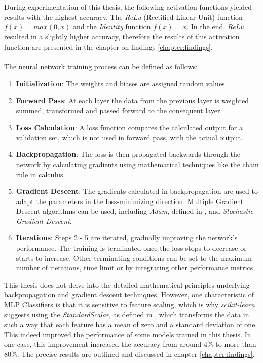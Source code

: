 \\\\
During experimentation of this thesis, the following activation functions yielded results with the highest accuracy. The \textit{ReLu} (Rectified Linear Unit) function $f(x)=max(0,x)$ and the \textit{Identity} function $f(x)=x$. In the end, \textit{ReLu} resulted in a slightly higher accuracy, therefore the results of this activation function are presented in the chapter on findings \ref{chapter:findings}.
\\\\
The neural network training process can be defined as follows:
\begin{enumerate}
    \item \textbf{Initialization}: The weights and biases are assigned random values.
    \item \textbf{Forward Pass}: At each layer the data from the previous layer is weighted summed, transformed and passed forward to the consequent layer.
    \item \textbf{Loss Calculation}: A loss function compares the calculated output for a validation set, which is not used in forward pass, with the actual output. 
    \item \textbf{Backpropagation}: The loss is then propagated backwards through the network by calculating gradients using mathematical techniques like the chain rule in calculus. 
    \item \textbf{Gradient Descent}: The gradients calculated in backpropagation are used to adapt the parameters in the loss-minimizing direction. Multiple Gradient Descent algorithms can be used, including \textit{Adam}, defined in \parencite{kingma2017adam}, and \textit{Stochastic Gradient Descent}. 
    \item \textbf{Iterations}: Steps 2 - 5 are iterated, gradually improving the network's performance. The training is terminated once the loss stops to decrease or starts to increase. Other terminating conditions can be set to the maximum number of iterations, time limit or by integrating other performance metrics. 
\end{enumerate}
This thesis does not delve into the detailed mathematical principles underlying backpropagation and gradient descent techniques. However, one characteristic of MLP Classifiers is that it is sensitive to feature scaling, which is why \textit{scikit-learn} \parencite{117Neura38:online} suggests using the \textit{StandardScalar}, as defined in \parencite{sklearnp90:online}, which transforms the data in such a way that each feature has a mean of zero and a standard deviation of one. This indeed improved the performance of some models trained in this thesis. In one case, this improvement increased the accuracy from around $4\%$ to more than $80\%$. The precise results are outlined and discussed in chapter \ref{chapter:findings}.

